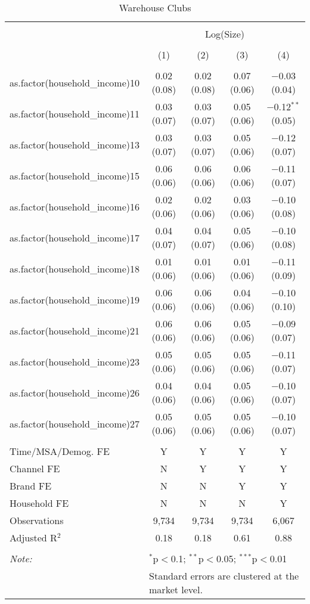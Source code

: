 
\begin{table}[!htbp] \centering 
  \caption{Warehouse Clubs} 
  \label{tab:packageSizeWarehouseTamponappendix} 
\begin{tabular}{@{\extracolsep{5pt}}lcccc} 
\\[-1.8ex]\hline 
\hline \\[-1.8ex] 
 & \multicolumn{4}{c}{Log(Size)} \\ 
\\[-1.8ex] & (1) & (2) & (3) & (4)\\ 
\hline \\[-1.8ex] 
 as.factor(household\_income)10 & 0.02 (0.08) & 0.02 (0.08) & 0.07 (0.06) & $-$0.03 (0.04) \\ 
  as.factor(household\_income)11 & 0.03 (0.07) & 0.03 (0.07) & 0.05 (0.06) & $-$0.12$^{**}$ (0.05) \\ 
  as.factor(household\_income)13 & 0.03 (0.07) & 0.03 (0.07) & 0.05 (0.06) & $-$0.12 (0.07) \\ 
  as.factor(household\_income)15 & 0.06 (0.06) & 0.06 (0.06) & 0.06 (0.06) & $-$0.11 (0.07) \\ 
  as.factor(household\_income)16 & 0.02 (0.06) & 0.02 (0.06) & 0.03 (0.06) & $-$0.10 (0.08) \\ 
  as.factor(household\_income)17 & 0.04 (0.07) & 0.04 (0.07) & 0.05 (0.06) & $-$0.10 (0.08) \\ 
  as.factor(household\_income)18 & 0.01 (0.06) & 0.01 (0.06) & 0.01 (0.06) & $-$0.11 (0.09) \\ 
  as.factor(household\_income)19 & 0.06 (0.06) & 0.06 (0.06) & 0.04 (0.06) & $-$0.10 (0.10) \\ 
  as.factor(household\_income)21 & 0.06 (0.06) & 0.06 (0.06) & 0.05 (0.06) & $-$0.09 (0.07) \\ 
  as.factor(household\_income)23 & 0.05 (0.06) & 0.05 (0.06) & 0.05 (0.06) & $-$0.11 (0.07) \\ 
  as.factor(household\_income)26 & 0.04 (0.06) & 0.04 (0.06) & 0.05 (0.06) & $-$0.10 (0.07) \\ 
  as.factor(household\_income)27 & 0.05 (0.06) & 0.05 (0.06) & 0.05 (0.06) & $-$0.10 (0.07) \\ 
 \hline \\[-1.8ex] 
Time/MSA/Demog. FE & Y & Y & Y & Y \\ 
Channel FE & N & Y & Y & Y \\ 
Brand FE & N & N & Y & Y \\ 
Household FE & N & N & N & Y \\ 
Observations & 9,734 & 9,734 & 9,734 & 6,067 \\ 
Adjusted R$^{2}$ & 0.18 & 0.18 & 0.61 & 0.88 \\ 
\hline 
\hline \\[-1.8ex] 
\textit{Note:}  & \multicolumn{4}{l}{$^{*}$p$<$0.1; $^{**}$p$<$0.05; $^{***}$p$<$0.01} \\ 
 & \multicolumn{4}{l}{Standard errors are clustered at the market level.} \\ 
\end{tabular} 
\end{table} 
